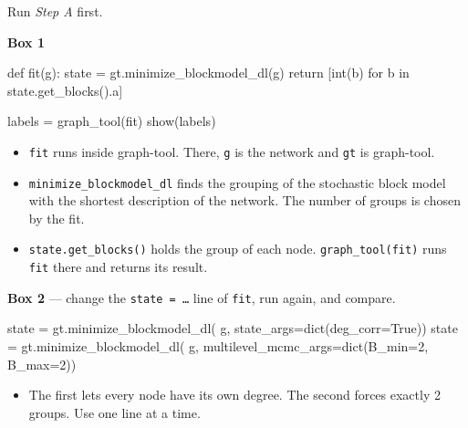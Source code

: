 \documentclass[a4paper, 11pt]{extarticle}
\begin{document}
Run \emph{Step A} first.

\textbf{Box 1}
\begin{code}
def fit(g):
    state = gt.minimize_blockmodel_dl(g)
    return [int(b) for b in state.get_blocks().a]

labels = graph_tool(fit)
show(labels)
\end{code}
\begin{itemize}
\item \texttt{fit} runs inside graph-tool. There, \texttt{g} is the network and \texttt{gt} is graph-tool.
\item \texttt{minimize\_blockmodel\_dl} finds the grouping of the stochastic block model with the shortest description of the network. The number of groups is chosen by the fit.
\item \texttt{state.get\_blocks()} holds the group of each node. \texttt{graph\_tool(fit)} runs \texttt{fit} there and returns its result.
\end{itemize}

\textbf{Box 2} --- change the \texttt{state = \ldots} line of \texttt{fit}, run again, and compare.
\begin{code}
state = gt.minimize_blockmodel_dl(
    g, state_args=dict(deg_corr=True))
state = gt.minimize_blockmodel_dl(
    g, multilevel_mcmc_args=dict(B_min=2, B_max=2))
\end{code}
\begin{itemize}
\item The first lets every node have its own degree. The second forces exactly 2 groups. Use one line at a time.
\end{itemize}
\end{document}
